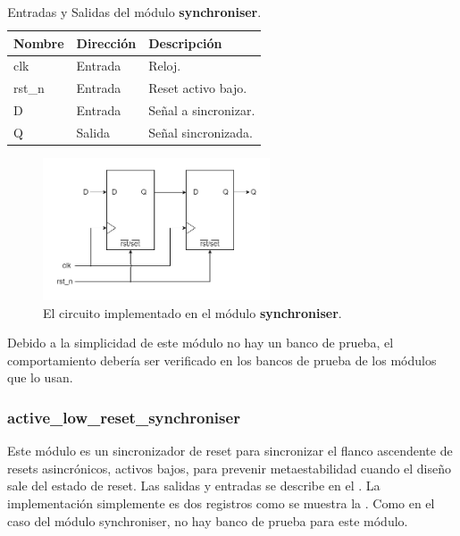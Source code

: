 \documentclass[a4paper, twoside, 11pt]{report}
\begin{document}
\begin{table}[htb]
  \centering
  \tablezebra
  \begin{tabulary}{\linewidth}{l|l|L}
    \textbf{Nombre}&\textbf{Dirección}&\textbf{Descripción} \\
    \hline
    clk&Entrada&Reloj. \\
    rst\_n&Entrada&Reset activo bajo. \\
    D&Entrada&Señal a sincronizar. \\
    Q&Salida&Señal sincronizada. \\
  \end{tabulary}
  \caption{Entradas y Salidas del módulo \textbf{synchroniser}.}
  \label{tab:ports_synchroniser}
\end{table}

\begin{figure}[htb]
  \centering
  \includegraphics[width=0.6\textwidth]{./img/synchroniser.drawio}
  \caption{El circuito implementado en el módulo \textbf{synchroniser}.}
  \label{fig:synchroniser}
\end{figure}

Debido a la simplicidad de este módulo no hay un banco de prueba, el comportamiento debería ser verificado en los bancos de prueba de los módulos que lo usan.

\FloatBarrier
\subsubsection{active\_low\_reset\_synchroniser}

Este módulo es un sincronizador de reset para sincronizar el flanco ascendente de resets asincrónicos, activos bajos, para prevenir metaestabilidad cuando el diseño sale del estado de reset. Las salidas y entradas se describe en el . La implementación simplemente es dos registros como se muestra la . Como en el caso del módulo synchroniser, no hay banco de prueba para este módulo.
\end{document}
